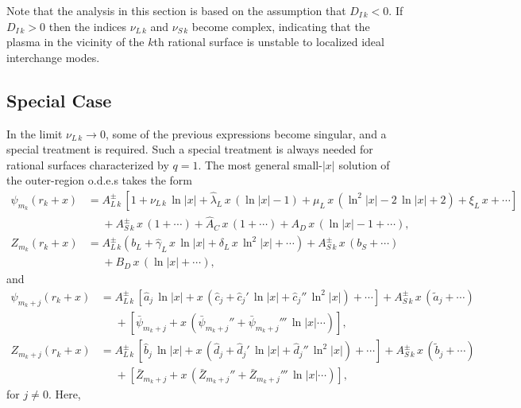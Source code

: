 \documentclass[12pt,prb,aps]{revtex4-1}
\begin{document}
Note that the  analysis in this section is based on the assumption that $ D_{I\,k}< 0$.
 If $D_{I\,k}>0$ then the indices $\nu_{L\,k}$ and $\nu_{S\,k}$ become
complex, indicating that the plasma in the vicinity of the $k$th rational surface is unstable to localized ideal interchange modes.\cite{mercier}

\subsection{Special Case}\label{sspec}
In the limit $\nu_{L\,k}\rightarrow 0$, some of the previous expressions become singular, and a special treatment is required. Such a special
treatment is always needed for  rational  surfaces characterized by $q=1$.  
The most general small-$|x|$ solution of the outer-region o.d.e.s 
takes the form
\begin{align}
\psi_{m_k}(r_k+x)&=A_{L\,k}^\pm \,[1+\nu_{L\,k}\,\ln|x|+\hat{\lambda}_{L}\,x\,(\ln |x|-1)+\mu_{L}\,x\,(\ln^2\!|x|-2\,\ln|x|+2) + \xi_{L}\,x+\cdots]  \nonumber\\[0.5ex]&\phantom{=}+ A_{S\,k}^{\pm}\,x\,(1+\cdots) + \hat{A}_{C}\,x\,(1+\cdots)+ A_{D}\,x\,(\ln |x|-1 + \cdots),\\[0.5ex]
Z_{m_k}(r_k+x)&= A_{L\,k}^\pm\left(b_L+\hat{\gamma}_{L}\,x\,\ln |x|+\delta_{L}\,x\,\ln^2\!|x|+\cdots\right) +A_{S\,k}^\pm\,x\,(b_{S}+\cdots)
\nonumber\\[0.5ex]&\phantom{=} + B_{D}\,x\,(\ln |x|+\cdots),
\end{align}
and 
\begin{align}
\psi_{m_k+j}(r_k+x)&=A_{L\,k}^\pm\,[\hat{a}_j\,\ln |x|+x\,(\hat{c}_j+\hat{c}_j'\,\ln|x|+\hat{c}_j''\,\ln^2|x|)+\cdots]+A_{S\,k}^\pm\,x\,(\tilde{a}_j+\cdots)  \nonumber\\[0.5ex]
&\phantom{=}+[ \bar{\psi}_{m_k+j}+
x\,(\bar{\psi}_{m_k+j}'' + \bar{\psi}_{m_k+j}'''\,\ln|x|\cdots)],\\[0.5ex]
Z_{m_k+j}(r_k+x)&= A_{L\,k}^\pm\,[\hat{b}_j\,\ln |x|+x\,(\hat{d}_j+\hat{d}_j'\,\ln|x|+\hat{d}_j''\,\ln^2|x|)+\cdots]+A_{S\,k}^\pm\,x\,(\tilde{b}_j+\cdots)  \nonumber\\[0.5ex]
&\phantom{=}+[ \bar{Z}_{m_k+j}+
x\,(\bar{Z}_{m_k+j}'' + \bar{Z}_{m_k+j}'''\,\ln|x|\cdots)],
\end{align}
for $j\neq 0$. 
Here, 
\end{document}
